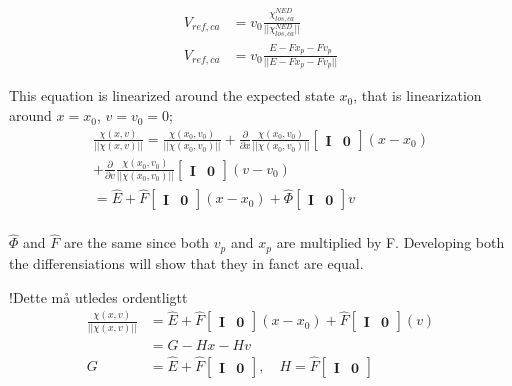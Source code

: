 \begin{align}
        V_{ref,ca} & = v_0 \frac{\chi^{NED}_{los,ca} }{|| \chi^{NED}_{los,ca} ||} \\
        V_{ref,ca} & = v_0 \frac{E - F x_p - F v_p }{|| E - F x_p - F v_p ||}
\end{align}

This equation is linearized around the expected state $x_0$, that is linearization around $x=x_0$, $v=v_0=0$;
\begin{multline}
    \frac{\chi(x,v)}{|| \chi(x,v) ||}  = \frac{\chi(x_0,v_0)}{|| \chi(x_0,v_0) ||} + \frac{\partial}{\partial x} \frac{\chi(x_0,v_0)}{|| \chi(x_0,v_0) ||}  \begin{bmatrix}\mathbf{I}  &\mathbf{0}\end{bmatrix}(x-x_0) \\+ \frac{\partial}{\partial v} \frac{\chi(x_0,v_0)}{|| \chi(x_0,v_0) ||}  \begin{bmatrix}\mathbf{I}  &\mathbf{0}\end{bmatrix}(v-v_0) \\
      = \hat{E} + \hat{F} \begin{bmatrix}\mathbf{I}  &\mathbf{0}\end{bmatrix}(x-x_0)  + \hat{\Phi} \begin{bmatrix}\mathbf{I}  &\mathbf{0}\end{bmatrix}v \\
\end{multline}

$\hat{\Phi}$ and $\hat{F}$ are the same since both $v_p$ and $x_p$ are multiplied by F. Developing both the differensiations will show that they in fanct are equal.

!Dette må utledes ordentligtt
\begin{align}
    \frac{\chi(x,v)}{|| \chi(x,v) ||} & = \hat{E} + \hat{F} \begin{bmatrix}\mathbf{I}  &\mathbf{0}\end{bmatrix}(x-x_0)  + \hat{F} \begin{bmatrix}\mathbf{I}  &\mathbf{0}\end{bmatrix}(v) \\
    & = G - H x  - H v \\
    G &= \hat{E} + \hat{F} \begin{bmatrix}\mathbf{I}  &\mathbf{0}\end{bmatrix}, \quad H = \hat{F} \begin{bmatrix}\mathbf{I}  &\mathbf{0}\end{bmatrix}
\end{align}


